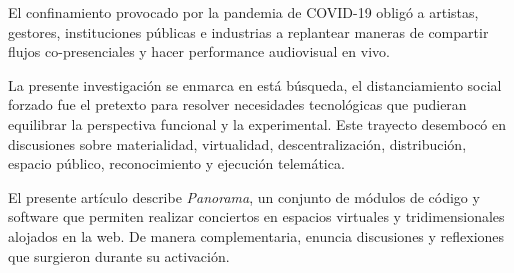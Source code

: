 
El confinamiento provocado por la pandemia de COVID-19 obligó a artistas, gestores, instituciones públicas e industrias a replantear maneras de compartir flujos co-presenciales y hacer performance audiovisual en vivo.

La presente investigación se enmarca en está búsqueda, el distanciamiento social forzado fue el pretexto para resolver necesidades tecnológicas que pudieran equilibrar la perspectiva funcional y la experimental. Este trayecto desembocó en discusiones sobre materialidad, virtualidad, descentralización, distribución, espacio público, reconocimiento  y ejecución telemática.                            

El presente artículo describe \textit{Panorama}, un conjunto de módulos de código y software que permiten realizar conciertos en espacios virtuales y tridimensionales alojados en la web. De manera complementaria, enuncia discusiones y reflexiones que surgieron durante su activación. 
